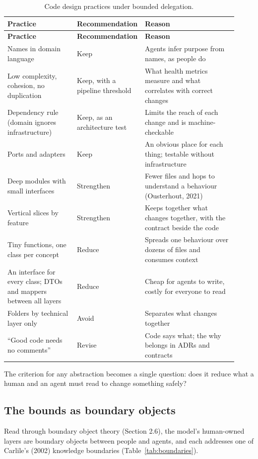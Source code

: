 \documentclass[11pt]{article}
\begin{document}
\small
\begin{longtable}{p{0.3\linewidth}p{0.22\linewidth}p{0.4\linewidth}}
\caption{Code design practices under bounded delegation.}\\
\toprule
\textbf{Practice} & \textbf{Recommendation} & \textbf{Reason} \\
\midrule
\endfirsthead
\toprule
\textbf{Practice} & \textbf{Recommendation} & \textbf{Reason} \\
\midrule
\endhead
Names in domain language & Keep & Agents infer purpose from names, as people do \\
Low complexity, cohesion, no duplication & Keep, with a pipeline threshold & What health metrics measure and what correlates with correct changes \\
Dependency rule (domain ignores infrastructure) & Keep, as an architecture test & Limits the reach of each change and is machine-checkable \\
Ports and adapters & Keep & An obvious place for each thing; testable without infrastructure \\
Deep modules with small interfaces & Strengthen & Fewer files and hops to understand a behaviour (Ousterhout, 2021) \\
Vertical slices by feature & Strengthen & Keeps together what changes together, with the contract beside the code \\
Tiny functions, one class per concept & Reduce & Spreads one behaviour over dozens of files and consumes context \\
An interface for every class; DTOs and mappers between all layers & Reduce & Cheap for agents to write, costly for everyone to read \\
Folders by technical layer only & Avoid & Separates what changes together \\
``Good code needs no comments'' & Revise & Code says what; the why belongs in ADRs and contracts \\
\bottomrule
\end{longtable}
\normalsize

The criterion for any abstraction becomes a single question: does it reduce what a human and an agent must read to change something safely?

\subsection{The bounds as boundary objects}

Read through boundary object theory (Section 2.6), the model's human-owned layers are boundary objects between people and agents, and each addresses one of Carlile's (2002) knowledge boundaries (Table~\ref{tab:boundaries}).
\end{document}
